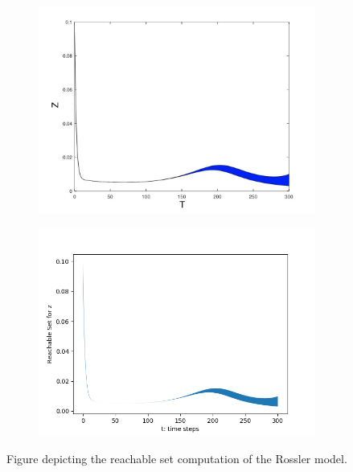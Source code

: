 \documentclass[EPiC]{easychair}
\begin{document}
\begin{figure}[h]
    \hspace{-15ex}  
    \begin{subfigure}{0.6\textwidth}
    \centering
    \includegraphics[width=\textwidth]{SapoFigures/Rosslert/SapoRosslerZ.jpg}
    \end{subfigure}
    \begin{subfigure}{0.6\textwidth}
    \centering
    \includegraphics[width=1.25\textwidth]{SapoFigures/Rosslert/KaaRosslerZ.png}
    \end{subfigure}
    
    \caption{Figure depicting the reachable set computation of the Rossler model.} 
    \label{fig3}
\end{figure}    
\end{document}
